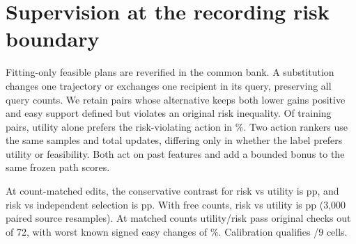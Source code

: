 \section{Supervision at the recording risk boundary}
Fitting-only feasible plans are reverified in the common bank.
A substitution changes one trajectory or exchanges one recipient
in its query, preserving all query counts. We retain pairs whose
alternative keeps both lower gains positive and easy support
defined but violates an original risk inequality.
Of \RiskCrossingPairs{} training pairs, utility alone prefers the
risk-violating action in \RiskCrossingDisagree{}\%. Two action
rankers use the same samples and \RiskCrossingUpdates{} total
updates, differing only in whether the label prefers utility or
feasibility. Both act on past features and add a bounded bonus to
the same frozen path scores.

At \RiskCrossingEdits{} count-matched edits, the conservative
contrast for risk vs utility is \RiskCrossingUtility{} pp, and
risk vs independent selection is \RiskCrossingIndependent{} pp.
With free counts, risk vs utility is \RiskCrossingFree{} pp
(3,000 paired source resamples). At matched counts utility/risk
pass \RiskCrossingPasses{} original checks out of 72, with worst
known signed easy changes of \RiskCrossingWorst{}\%.
Calibration qualifies \RiskCrossingQual{}/9 cells.

